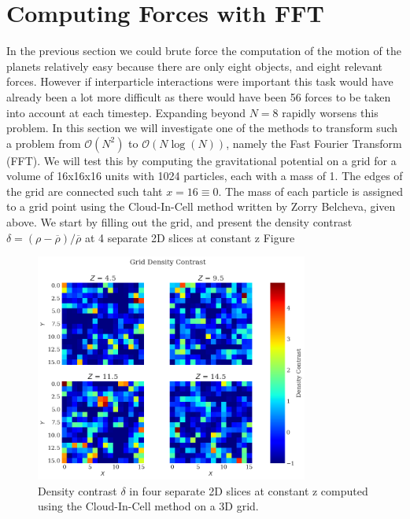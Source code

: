 \section{Computing Forces with FFT}





In the previous section we could brute force the computation of the motion of the planets relatively easy because there are only eight objects, and eight relevant forces. However if interparticle interactions were important this task would have already been a lot more difficult as there would have been 56 forces to be taken into account at each timestep. Expanding beyond $N = 8$ rapidly worsens this problem. In this section we will investigate one of the methods to transform such a problem from $\mathcal{O}(N^2)$ to $\mathcal{O}(N\log(N))$, namely the Fast Fourier Transform (FFT). We will test this by computing the gravitational potential on a grid for a volume of 16x16x16 units with 1024 particles, each with a mass of 1. The edges of the grid are connected such taht $x = 16 \equiv 0$. The mass of each particle is assigned to a grid point using the Cloud-In-Cell method written by Zorry Belcheva, given above. We start by filling out the grid, and present the density contrast $\delta = (\rho-\overline{\rho})/\overline{\rho}$ at 4 separate 2D slices at constant z Figure

\begin{figure}
    \centering
    \includegraphics[width=0.8\textwidth]{results/density_contrast_slices}
    \caption{Density contrast $\delta$ in four separate 2D slices at constant z computed using the Cloud-In-Cell method on a 3D grid.}
    \label{fig:dens_contrast}
\end{figure}

